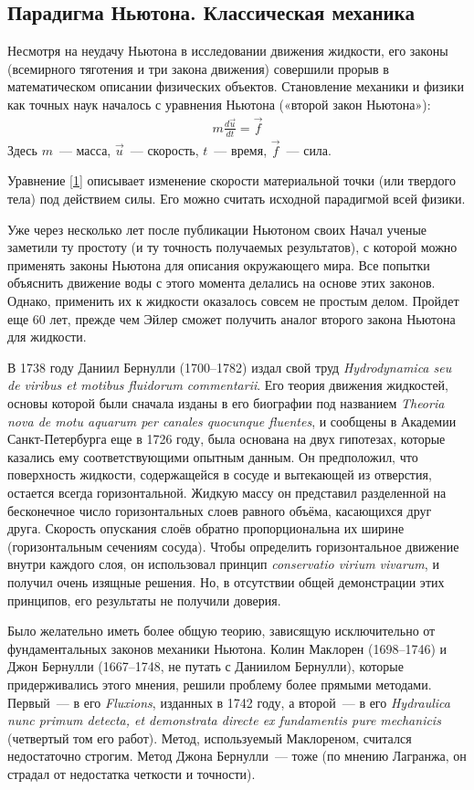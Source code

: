 \subsection{Парадигма Ньютона. Классическая механика}

Несмотря на неудачу Ньютона в исследовании движения жидкости, его законы (всемирного тяготения и три закона движения) 
совершили прорыв в математическом описании физических объектов. Становление механики и физики как точных наук началось с 
уравнения Ньютона («второй закон Ньютона»):
\begin{gather}
	m \frac{d \vec u}{d t} = \vec f
	\label{1}
\end{gather}
Здесь $m$~--- масса, $\vec u$~--- скорость, $t$~--- время, $\vec f$~--- сила.

Уравнение \ref{1} описывает изменение скорости материальной точки (или твердого тела) под действием силы.
 Его можно считать исходной парадигмой всей физики.

Уже через несколько лет после публикации Ньютоном своих Начал ученые заметили ту простоту (и ту точность получаемых 
результатов), с которой можно применять законы Ньютона для описания окружающего мира. Все попытки объяснить движение 
воды с этого момента делались на основе этих законов. Однако, применить их к жидкости оказалось совсем не простым делом.
 Пройдет еще 60 лет, прежде чем Эйлер сможет получить аналог второго закона Ньютона для жидкости.

В 1738 году Даниил Бернулли (1700--1782) издал свой труд \textit{Hydrodynamica seu de viribus et motibus fluidorum
commentarii}. Его теория движения жидкостей, основы которой были сначала изданы в его биографии под названием 
\textit{Theoria nova de motu aquarum per canales quocunque fluentes}, и сообщены в Академии Санкт-Петербурга 
еще в 1726 году, была основана на двух гипотезах, которые казались ему соответствующими опытным данным. 
Он предположил, что поверхность жидкости, содержащейся в сосуде и вытекающей из отверстия, остается всегда
горизонтальной. Жидкую массу он представил разделенной на бесконечное число горизонтальных слоев равного объёма,
касающихся друг друга. Скорость опускания слоёв обратно пропорциональна их ширине (горизонтальным сечениям сосуда).
Чтобы определить горизонтальное движение внутри каждого слоя, он использовал принцип \textit{ conservatio virium
vivarum}, и получил очень изящные решения. Но, в отсутствии общей демонстрации этих принципов, его результаты не
получили доверия.

Было желательно иметь более общую теорию, зависящую исключительно от фундаментальных законов механики Ньютона. 
Колин Маклорен (1698--1746) и Джон Бернулли (1667--1748, не путать с Даниилом Бернулли), которые придерживались 
этого мнения, решили проблему более прямыми методами. Первый~--- в его \textit{Fluxions}, изданных в 1742 году, 
а второй~--- в его \textit{Hydraulica nunc primum detecta, et demonstrata directe ex fundamentis pure mechanicis} 
(четвертый том его работ). Метод, используемый Маклореном, считался недостаточно строгим. Метод Джона Бернулли~--- 
тоже (по мнению Лагранжа, он страдал от недостатка четкости и точности).

